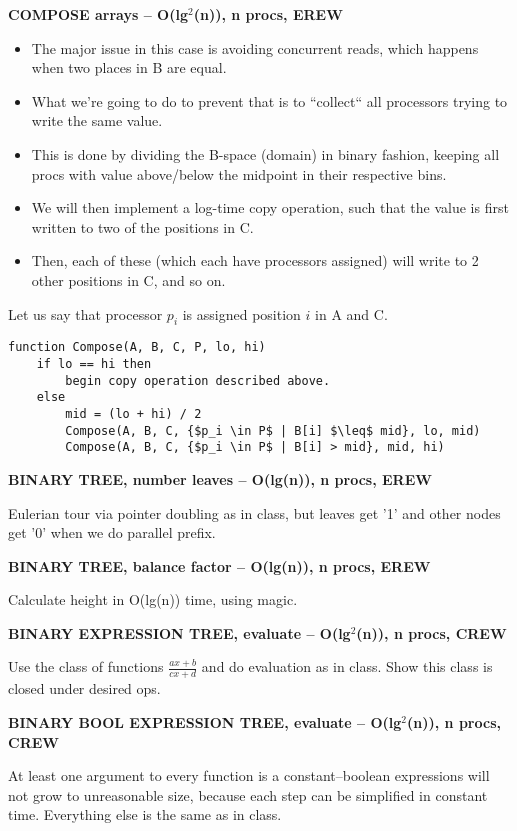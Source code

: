 \documentclass[12pt]{article}
\providecommand{\tightlist}{
    \setlength{\itemsep}{0pt}\setlength{\parskip}{0pt}
}
\begin{document}
\begin{centering}\textbf{COMPOSE arrays -- O(lg$^2$(n)), n procs, EREW}\par\end{centering}
\begin{itemize}\tightlist
  \item The major issue in this case is avoiding concurrent reads, which happens when two places in B are equal.
  \item What we're going to do to prevent that is to ``collect`` all processors trying to write the same value.
  \item This is done by dividing the B-space (domain) in binary fashion, keeping all procs with value above/below the midpoint in their respective bins.
  \item We will then implement a log-time copy operation, such that the value is first written to two of the positions in C.
  \item Then, each of these (which each have processors assigned) will write to 2 other positions in C, and so on.
\end{itemize}
Let us say that processor $p_i$ is assigned position $i$ in A and C.
\begin{lstlisting}
function Compose(A, B, C, P, lo, hi)
    if lo == hi then
        begin copy operation described above.
    else
        mid = (lo + hi) / 2
        Compose(A, B, C, {$p_i \in P$ | B[i] $\leq$ mid}, lo, mid)
        Compose(A, B, C, {$p_i \in P$ | B[i] > mid}, mid, hi)
\end{lstlisting}

\begin{centering}\textbf{BINARY TREE, number leaves -- O(lg(n)), n procs, EREW}\par\end{centering}
Eulerian tour via pointer doubling as in class, but leaves get '1' and other nodes get '0' when we do parallel prefix.

\begin{centering}\textbf{BINARY TREE, balance factor -- O(lg(n)), n procs, EREW}\par\end{centering}
Calculate height in O(lg(n)) time, using magic.

\begin{centering}\textbf{BINARY EXPRESSION TREE, evaluate -- O(lg$^2$(n)), n procs, CREW}\par\end{centering}
Use the class of functions $\frac{ax+b}{cx+d}$ and do evaluation as in class. Show this class is closed under desired ops.

\begin{centering}\textbf{BINARY BOOL EXPRESSION TREE, evaluate -- O(lg$^2$(n)), n procs, CREW}\par\end{centering}
At least one argument to every function is a constant--boolean expressions will not grow to unreasonable size, because each step can be simplified in constant time. Everything else is the same as in class.
\end{document}
